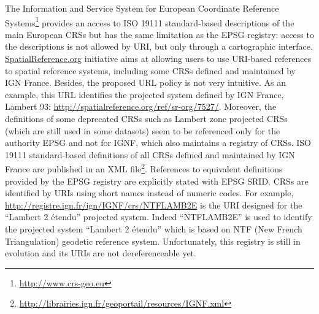 \begin{table}
\end{table}

The Information and Service System for European Coordinate Reference Systems\footnote{\url{http://www.crs-geo.eu}}  provides an access to ISO 19111 standard-based descriptions of the main European CRSs but has the same limitation as the EPSG registry: access to the descriptions is not allowed by URI, but only through a cartographic interface.
\url{SpatialReference.org} initiative aims at allowing users to use URI-based references to spatial reference systems, including some CRSs defined and maintained by IGN France.  Besides, the proposed URL policy is not very intuitive. As an example, this URL identifies the projected system defined by IGN France, Lambert 93: \url{http://spatialreference.org/ref/sr-org/7527/}. Moreover, the definitions of some deprecated CRSs such as Lambert zone projected CRSs (which are still used in some datasets) seem to be referenced only for the authority EPSG and not for IGNF, which also maintains a registry of CRSs. ISO 19111 standard-based definitions of all CRSs defined and maintained by IGN France are  published in an XML file\footnote{\url{ http://librairies.ign.fr/geoportail/resources/IGNF.xml}}.
References to equivalent definitions provided by the EPSG registry are explicitly stated with EPSG SRID. CRSs are identified by URIs using short names instead of numeric codes. For example, \url{http://registre.ign.fr/ign/IGNF/crs/NTFLAMB2E}  is the URI designed for the ``Lambert 2 \'{e}tendu'' projected system. Indeed ``NTFLAMB2E'' is used to identify the projected system ``Lambert 2 \'{e}tendu'' which is based on NTF (New French Triangulation) geodetic reference system. Unfortunately, this registry is still in evolution and its URIs are not dereferenceable yet.
 
